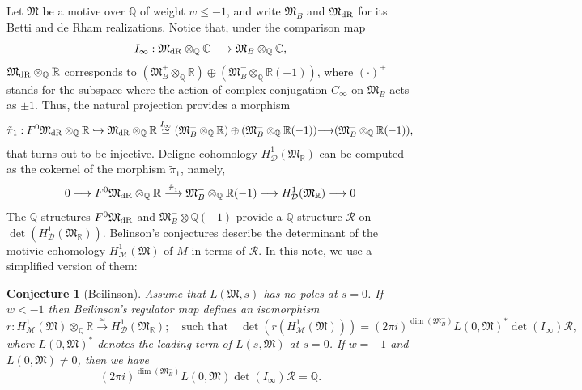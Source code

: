 \documentclass{amsart}
\newtheorem{conjecture}[theorem]{Conjecture}
\theoremstyle{definition}
\theoremstyle{remark}
\numberwithin{equation}{section}
\newcommand{\mfM}{{\mathfrak M}}
\newcommand{\Q}{{\mathbb Q}}
\newcommand{\C}{{\mathbb C}}
\newcommand{\R}{{\mathbb R}}
\newcommand{\cR}{{\mathcal R}}
\newcommand{\cD}{{\mathcal D}}
\newcommand{\cM}{{\mathcal M}}
\begin{document}
 Let $\mfM$ be a motive over $\Q$ of weight $w\leq-1$, and write $\mfM_B$ and $\mfM_{\rm dR}$ for its Betti and de Rham realizations.  Notice that, under the comparison map
\[
I_\infty: \mfM_{\rm dR}\otimes_\Q\C\longrightarrow \mfM_{B}\otimes_\Q\C,
\]
$\mfM_{\rm dR}\otimes_\Q\R$ corresponds to $(\mfM_{B}^+\otimes_\Q\R)\oplus(\mfM_{B}^-\otimes_\Q\R(-1))$, where $(\cdot)^\pm$ stands for the subspace where the action of complex conjugation $C_\infty$  on $\mfM_B$ acts as $\pm1$. 
Thus, the natural projection provides a morphism 
\begin{equation}\label{eqtildepi1}
\tilde \pi_1:F^0\mfM_{\rm dR}\otimes_\Q\R\hookrightarrow\mfM_{\rm dR}\otimes_\Q\R\stackrel{I_\infty}{\simeq}(\mfM_{B}^+\otimes_\Q\R)\oplus(\mfM_{B}^-\otimes_\Q\R(-1)){\longrightarrow} (\mfM_{B}^-\otimes_\Q\R(-1)),
\end{equation}
that turns out to be injective. Deligne cohomology $H^1_\cD(\mfM_\R)$ can be computed as the cokernel of the morphism $\tilde \pi_1$, namely, 
\[
0\longrightarrow F^0\mfM_{\rm dR}\otimes_\Q\R\stackrel{\tilde \pi_1}{\longrightarrow} \mfM_B^-\otimes_\Q\R(-1)\longrightarrow H^1_\cD(\mfM_\R)\longrightarrow 0
\]
The $\Q$-structures $F^0\mfM_{\rm dR}$ and $\mfM_B^{-}\otimes\Q(-1)$ provide a $\Q$-structure $\cR$ on $\det(H^1_\cD(\mfM_\R))$. Belinson's conjectures describe the determinant of the motivic cohomology $H^1_{\cM}(\mfM)$ of $M$ in terms of $\cR$. In this note, we use a simplified version of them:
\begin{conjecture}[Beilinson]\label{Beilconj}
Assume that $L(\mfM,s)$ has no poles at $s=0$.
    If $w< -1$ then Beilinson's regulator map defines an isomorphism
    \[
    r:H^1_{\cM}(\mfM)\otimes_\Q\R\stackrel{\simeq}{\longrightarrow}H^1_\cD(\mfM_\R);\quad\mbox{such that}\quad \det\left(r\left(H^1_{\cM}(\mfM)\right)\right)=(2\pi i)^{\dim(\mfM_B^-)}L(0,\mfM)^*\det(I_\infty)\cR,
    \]
    where $L(0,\mfM)^*$ denotes the leading term of $L(s,\mfM)$ at $s=0$.
    If $w=-1$ and $L(0,\mfM)\neq 0$, then we have
    \[
    (2\pi i)^{\dim(\mfM_B^-)}L(0,\mfM)\det(I_\infty)\cR=\Q. 
    \]
\end{conjecture}
\end{document}
